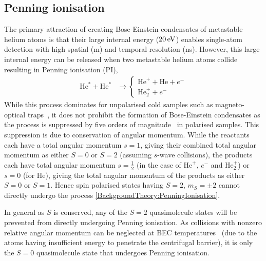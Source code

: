 \subsection{Penning ionisation}
\label{BackgroundTheory:PenningIonisation}

The primary attraction of creating Bose-Einstein condensates of metastable helium atoms is that their large internal energy ($\unit[20]{eV}$) enables single-atom detection with high spatial (\micro m) and temporal resolution (ns). However, this large internal energy can be released when two metastable helium atoms collide resulting in Penning ionisation (PI),
\begin{align}
    \label{BackgroundTheory:PenningIonisation}
    \text{He}^* + \text{He}^* & \rightarrow \left\{
        \begin{matrix}
            \text{He}^+ + \text{He} + e^-\\
            \text{He}_2^+ + e^-
        \end{matrix}\right.
\end{align}
While this process dominates for unpolarised cold samples such as magneto-optical traps~\citep{Bardou:1992}, it does not prohibit the formation of Bose-Einstein condensates as the process is suppressed by five orders of magnitude~\citep{Shlyapnikov:1994} in polarised samples.  This suppression is due to conservation of angular momentum. While the reactants each have a total angular momentum $s=1$, giving their combined total angular momentum as either $S=0$ or $S=2$ (assuming $s$-wave collisions), the products each have total angular momentum $s=\frac{1}{2}$ (in the case of $\text{He}^+$, $e^-$ and $\text{He}_2^+$) or $s=0$ (for $\text{He}$), giving the total angular momentum of the products as either $S=0$ or $S=1$. Hence spin polarised states having $S=2$, $m_S=\pm2$ cannot directly undergo the process \eqref{BackgroundTheory:PenningIonisation}.

In general as $S$ is conserved, any of the $S=2$ quasimolecule states will be prevented from directly undergoing Penning ionisation. As collisions with nonzero relative angular momentum can be neglected at BEC temperatures~\citep{Venturi:2000,Stas:2006kx} (due to the atoms having insufficient energy to penetrate the centrifugal barrier), it is only the $S=0$ quasimolecule state that undergoes Penning ionisation.

